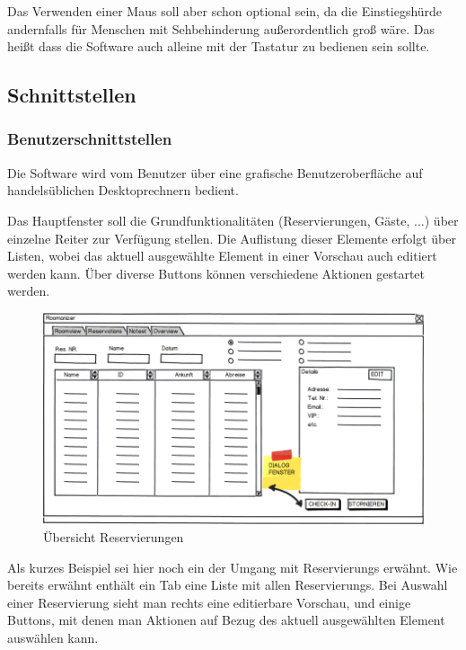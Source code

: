 \documentclass[10pt,a4paper,titlepage]{article}
\begin{document}
Das Verwenden einer Maus soll aber schon optional sein, da die Einstiegshürde andernfalls für Menschen mit Sehbehinderung außerordentlich groß wäre. Das heißt dass die Software auch alleine mit der Tastatur zu bedienen sein sollte.
\subsection{Schnittstellen}
\subsubsection{Benutzerschnittstellen}
Die Software wird vom Benutzer über eine grafische Benutzeroberfläche auf handelsüblichen Desktoprechnern bedient.

Das Hauptfenster soll die Grundfunktionalitäten (Reservierungen, Gäste, ...) über einzelne Reiter zur Verfügung stellen. Die Auflistung dieser Elemente erfolgt über Listen, wobei das aktuell ausgewählte Element in einer Vorschau auch editiert werden kann. Über diverse Buttons können verschiedene Aktionen gestartet werden.
\begin{figure}[h]
	\includegraphics[width=\linewidth]{Images/GUI_Overview.png}
	\caption{Übersicht Reservierungen}
\end{figure}

Als kurzes Beispiel sei hier noch ein der Umgang mit \Glspl{Reservierung} erwähnt. Wie bereits erwähnt enthält ein Tab eine Liste mit allen \Glspl{Reservierung}. Bei Auswahl einer \Gls{Reservierung} sieht man rechts eine editierbare Vorschau, und einige Buttons, mit denen man Aktionen auf Bezug des aktuell ausgewählten Element auswählen kann.
\end{document}
